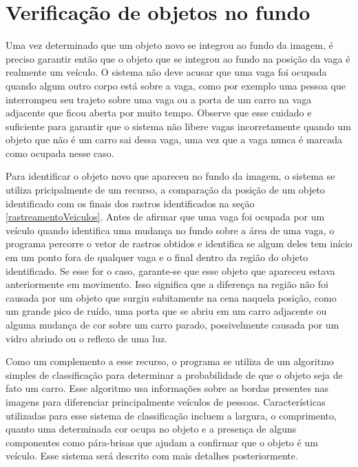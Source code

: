\section{Verificação de objetos no fundo}\label{verificaoObjetosFundo}

    Uma vez determinado que um objeto novo se integrou ao fundo da imagem, é preciso garantir então que o objeto que se integrou ao fundo na posição da vaga é realmente um veículo. O sistema não deve acusar que uma vaga foi ocupada quando algum outro corpo está sobre a vaga, como por exemplo uma pessoa que interrompeu seu trajeto sobre uma vaga ou a porta de um carro na vaga adjacente que ficou aberta por muito tempo. Observe que esse cuidado e suficiente para garantir que o sistema não libere vagas incorretamente quando um objeto que não é um carro sai dessa vaga, uma vez que a vaga nunca é marcada como ocupada nesse caso.

    Para identificar o objeto novo que apareceu no fundo da imagem, o sistema se utiliza pricipalmente de um recurso, a comparação da posição de um objeto identificado com os finais dos rastros identificados na seção \ref{rastreamentoVeiculos}. Antes de afirmar que uma vaga foi ocupada por um veículo quando identifica uma mudança no fundo sobre a área de uma vaga, o programa percorre o vetor de rastros obtidos e identifica se algum deles tem início em um ponto fora de qualquer vaga e o final dentro da região do objeto identificado. Se esse for o caso, garante-se que esse objeto que apareceu estava anteriormente em movimento. Isso significa que a diferença na região não foi causada por um objeto que surgiu subitamente na cena naquela posição, como um grande pico de ruído, uma porta que se abriu em um carro adjacente ou alguma mudança de cor sobre um carro parado, possivelmente causada por um vidro abrindo ou o reflexo de uma luz.

    Como um complemento a esse recurso, o programa se utiliza de um algoritmo simples de classificação para determinar a probabilidade de que o objeto seja de fato um carro. Esse algoritmo usa informações sobre as bordas presentes nas imagens para diferenciar principalmente veículos de pessoas. Características utilizadas para esse sistema de classificação incluem a largura, o comprimento, quanto uma determinada cor ocupa no objeto e a presença de alguns componentes como pára-brisas que ajudam a confirmar que o objeto é um veículo. Esse sistema será descrito com mais detalhes posteriormente.






